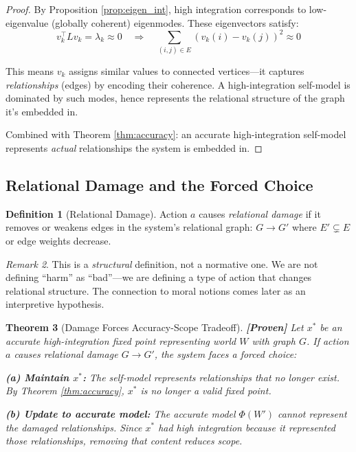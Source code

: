 \documentclass[11pt]{article}
\newtheorem{theorem}{Theorem}[section]
\theoremstyle{definition}
\newtheorem{definition}[theorem]{Definition}
\theoremstyle{remark}
\newtheorem{remark}[theorem]{Remark}
\begin{document}
\begin{proof}
By Proposition \ref{prop:eigen_int}, high integration corresponds to low-eigenvalue (globally coherent) eigenmodes. These eigenvectors satisfy:
\[
v_k^\top L v_k = \lambda_k \approx 0 \quad \Rightarrow \quad \sum_{(i,j) \in E} (v_k(i) - v_k(j))^2 \approx 0
\]

This means $v_k$ assigns similar values to connected vertices---it captures \emph{relationships} (edges) by encoding their coherence. A high-integration self-model is dominated by such modes, hence represents the relational structure of the graph it's embedded in.

Combined with Theorem \ref{thm:accuracy}: an accurate high-integration self-model represents \emph{actual} relationships the system is embedded in.
\end{proof}

\subsection{Relational Damage and the Forced Choice}

\begin{definition}[Relational Damage]
Action $a$ causes \emph{relational damage} if it removes or weakens edges in the system's relational graph: $G \to G'$ where $E' \subsetneq E$ or edge weights decrease.
\end{definition}

\begin{remark}
This is a \emph{structural} definition, not a normative one. We are not defining ``harm'' as ``bad''---we are defining a type of action that changes relational structure. The connection to moral notions comes later as an interpretive hypothesis.
\end{remark}

\begin{theorem}[Damage Forces Accuracy-Scope Tradeoff]\label{thm:forced_choice}
\textbf{[Proven]} Let $x^*$ be an accurate high-integration fixed point representing world $W$ with graph $G$. If action $a$ causes relational damage $G \to G'$, the system faces a forced choice:

\textbf{(a) Maintain $x^*$:} The self-model represents relationships that no longer exist. By Theorem \ref{thm:accuracy}, $x^*$ is no longer a valid fixed point.

\textbf{(b) Update to accurate model:} The accurate model $\Phi(W')$ cannot represent the damaged relationships. Since $x^*$ had high integration \emph{because} it represented those relationships, removing that content reduces scope.
\end{theorem}
\end{document}
